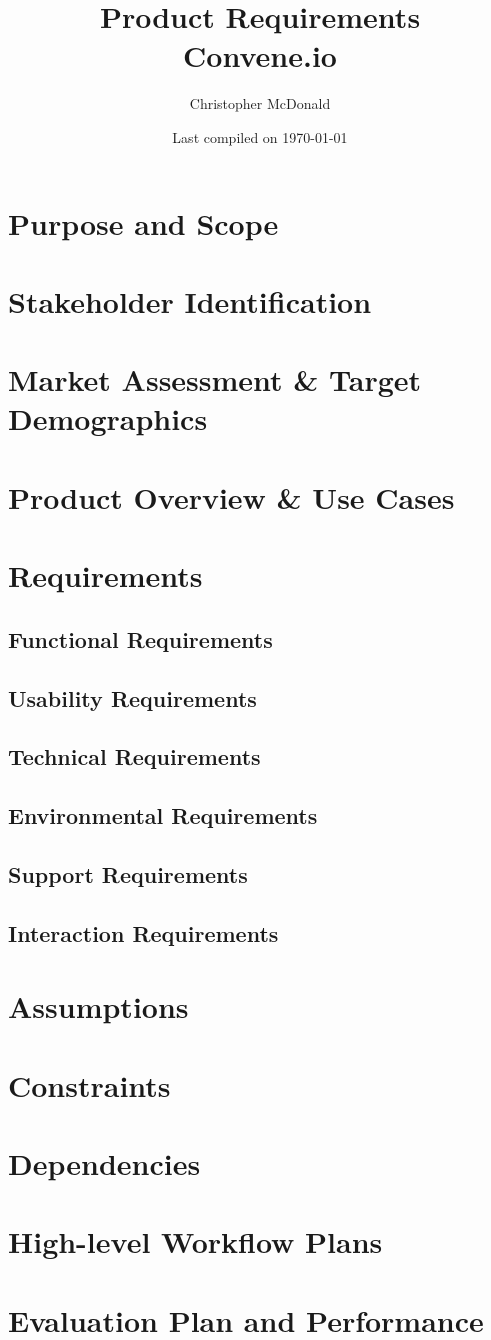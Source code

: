 \documentclass[11pt, oneside]{article}
\title{ Product Requirements \\ Convene.io}
\author{Christopher McDonald}
\date{Last compiled on \today}
\begin{document}
\maketitle
\tableofcontents
\section{Purpose and Scope}
\section{Stakeholder Identification}
\section{Market Assessment \& Target Demographics}
\section{Product Overview \& Use Cases}
\section{Requirements}
\subsection{Functional Requirements}
\subsection{Usability Requirements}
\subsection{Technical Requirements}
\subsection{Environmental Requirements}
\subsection{Support Requirements}
\subsection{Interaction Requirements}
\section{Assumptions}
\section{Constraints}
\section{Dependencies}
\section{High-level Workflow Plans}
\section{Evaluation Plan and Performance}
\end{document}
